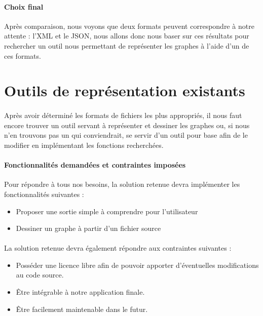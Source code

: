   \paragraph{Choix final}
  Après comparaison, nous voyons que deux formats peuvent correspondre à notre attente : l'XML et le JSON, nous allons donc nous baser sur ces résultats pour rechercher un outil nous permettant de représenter les graphes à l'aide d'un de ces formats.

  \section{Outils de représentation existants}
  
  \paragraph{}
  Après avoir déterminé les formats de fichiers les plus appropriés, il nous faut encore trouver un outil servant à représenter et dessiner les graphes ou, si nous n'en trouvons pas un qui conviendrait, se servir d'un outil pour base afin de le modifier en implémentant les fonctions recherchées.
  
  \paragraph{Fonctionnalités demandées et contraintes imposées}
  Pour répondre à tous nos besoins, la solution retenue devra implémenter les fonctionnalités suivantes : 
  \begin{itemize}
  	\item Proposer une sortie simple à comprendre pour l'utilisateur
  	\item Dessiner un graphe à partir d'un fichier source
  \end{itemize}
  
  \paragraph{}
  La solution retenue devra également répondre aux contraintes suivantes : 
  \begin{itemize}
  	\item Posséder une licence libre afin de pouvoir apporter d'éventuelles modifications au code source.
  	\item Être intégrable à notre application finale.
  	\item Être facilement maintenable dans le futur.
  \end{itemize}

